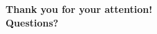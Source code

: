 \begin{frame}
	
	\centering
	{\huge\textbf{Thank you for your attention!}}
	\\\vspace{1.5cm}
	{\large\textbf{Questions?}}
\end{frame}

%	
%	
